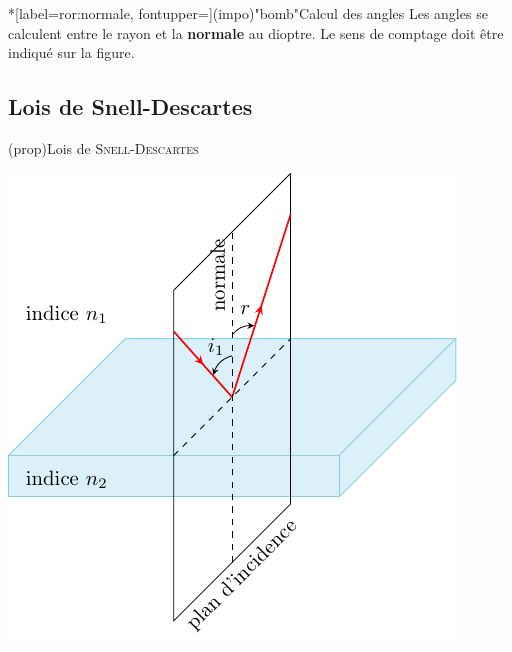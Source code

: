 \documentclass[../../main/main.tex]{subfiles}
\begin{document}
\begin{tcb*}*[label=ror:normale, fontupper=\Huge](impo)"bomb"{Calcul des angles}
	Les angles se calculent entre le rayon et la \textbf{normale} au dioptre. Le
	sens de comptage doit être indiqué sur la figure.
\end{tcb*}

\subsection{Lois de Snell-Descartes}

\begin{tcb*}[label=loi:snelldescartes](prop){Lois de \textsc{Snell-Descartes}}
	\tcblower
	\begin{minipage}{0.45\linewidth}
		\begin{center}
			\includegraphics[width=\linewidth]{snell_refl}
			\label{fig:snell_refl}
		\end{center}
	\end{minipage}

\end{tcb*}
\end{document}
